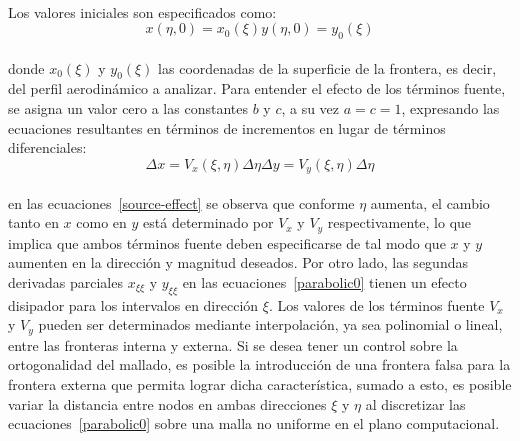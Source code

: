 \documentclass[letterpaper, openright, 12pt]{book}
\begin{document}
    \paragraph*{}
    Los valores iniciales son especificados como:
    \begin{subequations}
        \begin{equation}
            x(\eta, 0) = x_0(\xi)
        \end{equation}
        \begin{equation}
            y(\eta, 0) = y_0(\xi)
        \end{equation}
    \end{subequations}\\
    donde $x_0(\xi)$ y $y_0(\xi)$ las coordenadas de la superficie de la
    frontera, es decir, del perfil aerodinámico a analizar. Para entender el
    efecto de los términos fuente, se asigna un valor cero a las constantes
    $b$ y $c$, a su vez $a = c = 1$, expresando las ecuaciones resultantes
    en términos de incrementos en lugar de términos diferenciales:
    \begin{subequations}
        \begin{equation}
            \Delta x = V_x(\xi, \eta) \Delta \eta
        \end{equation}
        \begin{equation}
            \Delta y = V_y(\xi, \eta) \Delta \eta
        \end{equation}
        \label{source-effect}
    \end{subequations}\\
    en las ecuaciones~\ref{source-effect} se observa que conforme $\eta$
    aumenta, el cambio tanto en $x$ como en $y$ está determinado por $V_x$
    y $V_y$ respectivamente, lo que implica que ambos términos fuente deben
    especificarse de tal modo que $x$ y $y$ aumenten en la dirección y
    magnitud deseados. Por otro lado, las segundas derivadas parciales
    $x_{\xi\xi}$ y $y_{\xi\xi}$ en las ecuaciones~\ref{parabolic0} tienen un
    efecto disipador para los intervalos en dirección $\xi$. Los valores de
    los términos fuente $V_x$ y $V_y$ pueden ser determinados mediante
    interpolación, ya sea polinomial o lineal, entre las fronteras interna y
    externa. Si se desea tener un control sobre la ortogonalidad del
    mallado, es posible la introducción de una frontera falsa para la
    frontera externa que permita lograr dicha característica, sumado a esto,
    es posible variar la distancia entre nodos en ambas direcciones $\xi$ y
    $\eta$ al discretizar las ecuaciones~\ref{parabolic0} sobre una malla no
    uniforme en el plano computacional.
\end{document}
